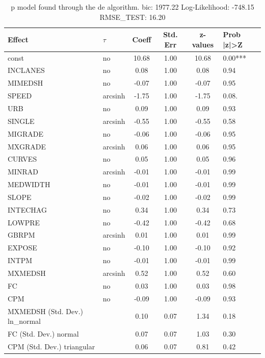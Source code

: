 \begin{table}
	\caption{p model found through the de algorithm. bic: 1977.22 Log-Likelihood: -748.15 RMSE_TEST: 16.20}
	\begin{center}
		\begin{tabular}{|l|l|c|c|c|l|}
			\hline
			Effect & $\tau$ & Coeff & Std. Err & z-values & Prob |z|>Z \\
			\hline
			const & no & 10.68 & 1.00 & 10.68 & 0.00*** \\
			\hline
			INCLANES & no & 0.08 & 1.00 & 0.08 & 0.94 \\
			\hline
			MIMEDSH & no & -0.07 & 1.00 & -0.07 & 0.95 \\
			\hline
			SPEED & arcsinh & -1.75 & 1.00 & -1.75 & 0.08. \\
			\hline
			URB & no & 0.09 & 1.00 & 0.09 & 0.93 \\
			\hline
			SINGLE & arcsinh & -0.55 & 1.00 & -0.55 & 0.58 \\
			\hline
			MIGRADE & no & -0.06 & 1.00 & -0.06 & 0.95 \\
			\hline
			MXGRADE & arcsinh & 0.06 & 1.00 & 0.06 & 0.95 \\
			\hline
			CURVES & no & 0.05 & 1.00 & 0.05 & 0.96 \\
			\hline
			MINRAD & arcsinh & -0.01 & 1.00 & -0.01 & 0.99 \\
			\hline
			MEDWIDTH & no & -0.01 & 1.00 & -0.01 & 0.99 \\
			\hline
			SLOPE & no & -0.02 & 1.00 & -0.02 & 0.99 \\
			\hline
			INTECHAG & no & 0.34 & 1.00 & 0.34 & 0.73 \\
			\hline
			LOWPRE & no & -0.42 & 1.00 & -0.42 & 0.68 \\
			\hline
			GBRPM & arcsinh & 0.01 & 1.00 & 0.01 & 0.99 \\
			\hline
			EXPOSE & no & -0.10 & 1.00 & -0.10 & 0.92 \\
			\hline
			INTPM & no & -0.01 & 1.00 & -0.01 & 0.99 \\
			\hline
			MXMEDSH & arcsinh & 0.52 & 1.00 & 0.52 & 0.60 \\
			\hline
			FC & no & 0.03 & 1.00 & 0.03 & 0.98 \\
			\hline
			CPM & no & -0.09 & 1.00 & -0.09 & 0.93 \\
			\hline
			MXMEDSH (Std. Dev.) ln_normal &  & 0.10 & 0.07 & 1.34 & 0.18 \\
			\hline
			FC (Std. Dev.) normal &  & 0.07 & 0.07 & 1.03 & 0.30 \\
			\hline
			CPM (Std. Dev.) triangular &  & 0.06 & 0.07 & 0.81 & 0.42 \\
			\hline
		\end{tabular}
	\end{center}
\end{table}